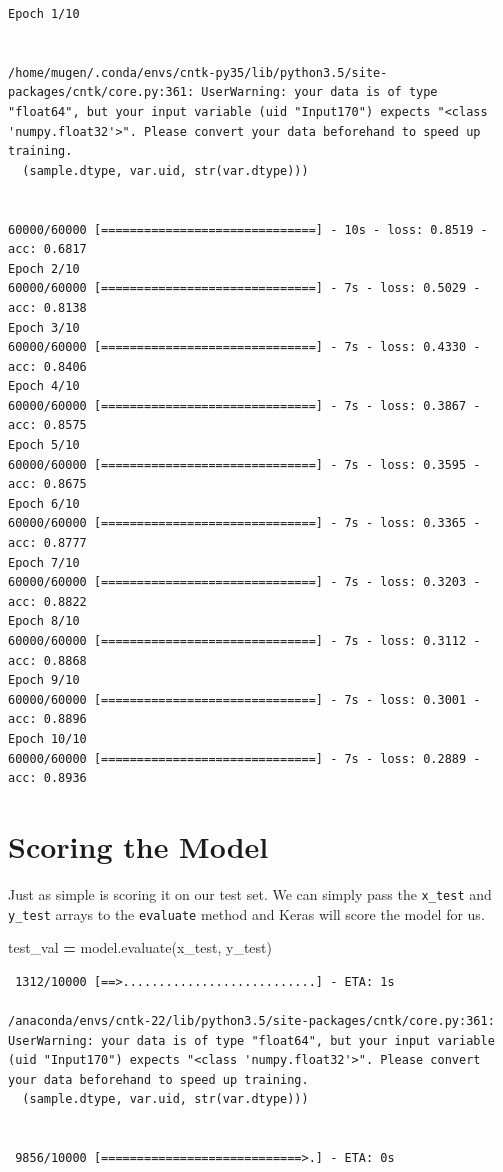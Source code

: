 \documentclass[]{book}
\newenvironment{Shaded}{\begin{snugshade}}{\end{snugshade}}
\newcommand{\OperatorTok}[1]{\textcolor[rgb]{0.81,0.36,0.00}{\textbf{#1}}}
\newcommand{\NormalTok}[1]{#1}
\theoremstyle{definition}
\theoremstyle{definition}
\theoremstyle{definition}
\theoremstyle{remark}
\begin{document}
\begin{verbatim}
Epoch 1/10


/home/mugen/.conda/envs/cntk-py35/lib/python3.5/site-packages/cntk/core.py:361: UserWarning: your data is of type "float64", but your input variable (uid "Input170") expects "<class 'numpy.float32'>". Please convert your data beforehand to speed up training.
  (sample.dtype, var.uid, str(var.dtype)))


60000/60000 [==============================] - 10s - loss: 0.8519 - acc: 0.6817    
Epoch 2/10
60000/60000 [==============================] - 7s - loss: 0.5029 - acc: 0.8138     
Epoch 3/10
60000/60000 [==============================] - 7s - loss: 0.4330 - acc: 0.8406     
Epoch 4/10
60000/60000 [==============================] - 7s - loss: 0.3867 - acc: 0.8575     
Epoch 5/10
60000/60000 [==============================] - 7s - loss: 0.3595 - acc: 0.8675     
Epoch 6/10
60000/60000 [==============================] - 7s - loss: 0.3365 - acc: 0.8777     
Epoch 7/10
60000/60000 [==============================] - 7s - loss: 0.3203 - acc: 0.8822     
Epoch 8/10
60000/60000 [==============================] - 7s - loss: 0.3112 - acc: 0.8868     
Epoch 9/10
60000/60000 [==============================] - 7s - loss: 0.3001 - acc: 0.8896     
Epoch 10/10
60000/60000 [==============================] - 7s - loss: 0.2889 - acc: 0.8936     
\end{verbatim}

\section{Scoring the Model}\label{scoring-the-model}

Just as simple is scoring it on our test set. We can simply pass the
\texttt{x\_test} and \texttt{y\_test} arrays to the \texttt{evaluate}
method and Keras will score the model for us.

\begin{Shaded}
\begin{Highlighting}[]
\NormalTok{test_val }\OperatorTok{=}\NormalTok{ model.evaluate(x_test, y_test)}
\end{Highlighting}
\end{Shaded}

\begin{verbatim}
 1312/10000 [==>...........................] - ETA: 1s

/anaconda/envs/cntk-22/lib/python3.5/site-packages/cntk/core.py:361: UserWarning: your data is of type "float64", but your input variable (uid "Input170") expects "<class 'numpy.float32'>". Please convert your data beforehand to speed up training.
  (sample.dtype, var.uid, str(var.dtype)))


 9856/10000 [============================>.] - ETA: 0s
\end{verbatim}
\end{document}
